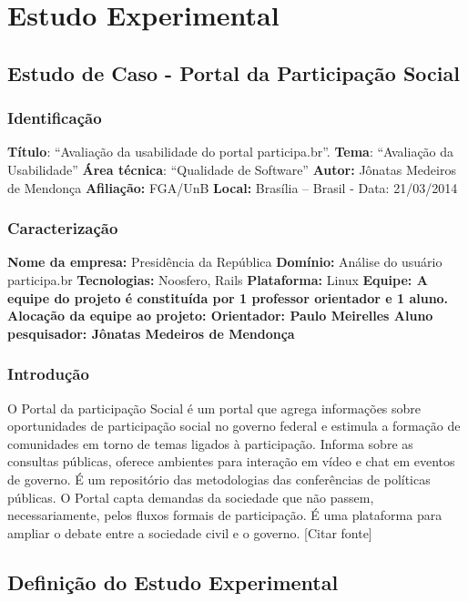 \chapter{Estudo Experimental}

\section{Estudo de Caso - Portal da Participação Social}

\subsection{Identificação}

\textbf{Título}:  “Avaliação da usabilidade do portal participa.br”.
\textbf{Tema}: “Avaliação da Usabilidade”
\textbf{Área técnica}: “Qualidade de Software” 
\textbf{Autor:} Jônatas Medeiros de Mendonça
\textbf{Afiliação:} FGA/UnB
\textbf{Local:} Brasília – Brasil - Data:  21/03/2014

\subsection{Caracterização}

\textbf{Nome da empresa:} Presidência da República
\textbf{Domínio:} Análise do usuário participa.br
\textbf{Tecnologias:} Noosfero, Rails 
\textbf{Plataforma:} Linux
\textbf{Equipe: A equipe do projeto é constituída por 1 professor orientador e 1 aluno.}
\textbf{Alocação da equipe ao projeto: 
	Orientador: Paulo Meirelles
	Aluno pesquisador: Jônatas Medeiros de Mendonça}

\subsection{Introdução}

O Portal da participação Social é um portal que agrega informações sobre oportunidades de participação social no governo federal e estimula a formação de comunidades em torno de temas ligados à participação. Informa sobre as consultas públicas, oferece ambientes para interação em vídeo e chat em eventos de governo. É um repositório das metodologias das conferências de políticas públicas. O Portal capta demandas da sociedade que não passem, necessariamente, pelos fluxos formais de participação. É uma plataforma para ampliar o debate entre a sociedade civil e o governo. [Citar fonte]


\section{Definição do Estudo Experimental}


